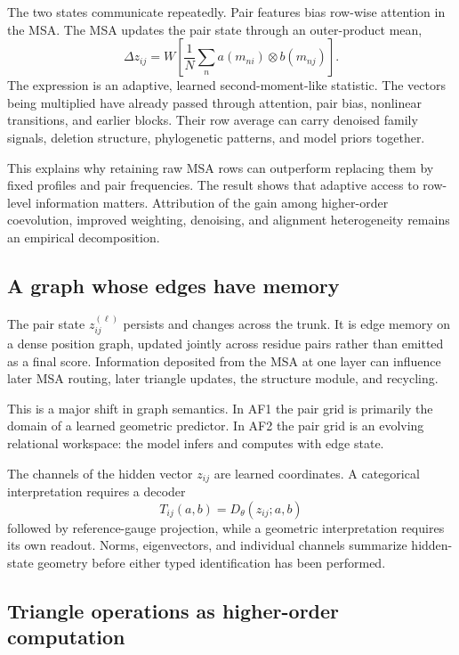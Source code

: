 The two states communicate repeatedly.  Pair features bias row-wise attention in the MSA.  The MSA
updates the pair state through an outer-product mean,
\begin{equation}
\Delta z_{ij}
=W\left[
\frac{1}{N}\sum_n
a(m_{ni})\otimes b(m_{nj})
\right].
\label{eq:book-af2-opm}
\end{equation}
The expression is an adaptive, learned second-moment-like statistic.  The vectors being multiplied
have already passed through attention, pair bias, nonlinear transitions,
and earlier blocks.  Their row average can carry denoised family signals, deletion structure,
phylogenetic patterns, and model priors together.

This explains why retaining raw MSA rows can outperform replacing them by fixed profiles and pair
frequencies.  The result shows that adaptive access to row-level information matters.  Attribution
of the gain among higher-order coevolution, improved weighting, denoising, and alignment
heterogeneity remains an empirical decomposition.

\subsection{A graph whose edges have memory}

The pair state $z_{ij}^{(\ell)}$ persists and changes across the trunk.  It is edge memory on a
dense position graph, updated jointly across residue pairs rather than emitted as a final score.
Information deposited from the MSA at one layer can influence later MSA routing, later triangle
updates, the structure module, and recycling.

This is a major shift in graph semantics.  In AF1 the pair grid is primarily the domain of a learned
geometric predictor.  In AF2 the pair grid is an evolving relational workspace: the model infers
and computes with edge state.

The channels of the hidden vector $z_{ij}$ are learned coordinates.  A categorical interpretation
requires a decoder
\begin{equation}
T_{ij}(a,b)=D_\theta(z_{ij};a,b)
\end{equation}
followed by reference-gauge projection, while a geometric interpretation requires its own readout.
Norms, eigenvectors, and individual channels summarize hidden-state geometry before either typed
identification has been performed.

\subsection{Triangle operations as higher-order computation}


